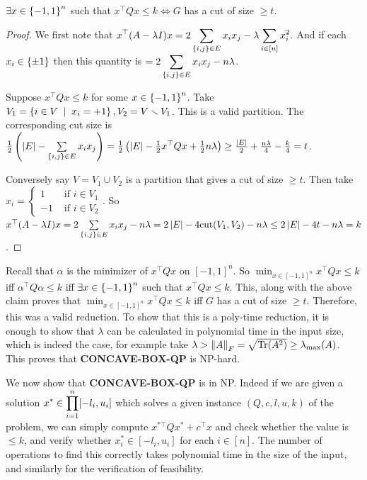 \begin{cl}
$\exists x\in \left\{-1,1\right\}^{n}$ such that $x^{\top}Qx\le k\iff G$ has a cut of size $\ge t$.
\end{cl}
\begin{proof}
We first note that $\displaystyle x^{\top}(A-\lambda I)x = 2\sum_{\left\{i,j\right\}\in E}x_{i}x_{j} - \lambda \sum_{i\in [n]}x_{i}^{2}.$ And if each $x_{i}\in \left\{\pm1\right\}$ then this quantity is $\displaystyle= 2\sum_{\left\{i,j\right\}\in E}x_{i}x_{j} - n\lambda$.

Suppose $x^{\top}Qx \le k$ for some $x\in \left\{-1,1\right\}^{n}$. Take $V_{1} = \set{i\in V\st x_{i}=+1}, V_{2} = V\smallsetminus V_{1}$. This is a valid partition. The corresponding cut size is $\frac12\left(\left| E \right| - \sum\limits_{\left\{i,j\right\}\in E}x_{i}x_{j}\right) = \frac12\left(\left| E \right| - \frac12x^{\top}Qx + \frac12 n\lambda\right) \ge \frac{\left| E \right|}{2} + \frac{n\lambda}{4} -\frac{k}{4} = t$.

Conversely say $V = V_{1}\cup V_{2}$ is a partition that gives a cut of size $\ge t$. Then take $x_{i} = \begin{cases}1&\text{ if } i\in V_{1} \\ -1&\text{ if } i\in V_{2} \end{cases}$. So $x^{\top}(A-\lambda I)x = 2\sum\limits_{\left\{i,j\right\}\in E}x_{i}x_{j} - n\lambda = 2\left| E \right| - 4\text{cut}(V_{1},V_{2}) - n\lambda \le 2\left| E \right| - 4t - n\lambda = k$.
\end{proof}

Recall that $\alpha$ is the minimizer of $x^{\top}Qx$ on $[-1,1]^{n}$. So $\min_{x\in [-1,1]^{n}} x^{\top}Qx \le k$ iff $\alpha^{\top}Q\alpha \le k$ iff $\exists x\in \left\{-1,1\right\}^{n}$ such that $x^{\top}Qx\le k$. This, along with the above claim proves that $\min_{x\in [-1,1]^{n}} x^{\top}Qx \le k$ iff $G$ has a cut of size $\ge t$. Therefore, this was a valid reduction. To show that this is a poly-time reduction, it is enough to show that $\lambda$ can be calculated in polynomial time in the input size, which is indeed the case, for example take $\lambda > \left\lVert A \right\rVert_{F} = \sqrt{\operatorname{Tr}(A^{2})} \ge \lambda_{\max}(A)$. This proves that \textbf{CONCAVE-BOX-QP} is NP-hard.

We now show that \textbf{CONCAVE-BOX-QP} is in NP. Indeed if we are given a solution $\displaystyle x^{*}\in \prod_{i=1}^{n}[-l_{i},u_{i}]$ which solves a given instance $(Q,c,l,u,k)$ of the problem, we can simply compute $x^{*\top}Qx^{*} + c^{\top} x$ and check whether the value is $\le k$, and verify whether $x^{*}_{i}\in [-l_{i},u_{i}]$ for each $i\in[n]$. The number of operations to find this correctly takes polynomial time in the size of the input, and similarly for the verification of feasibility.




